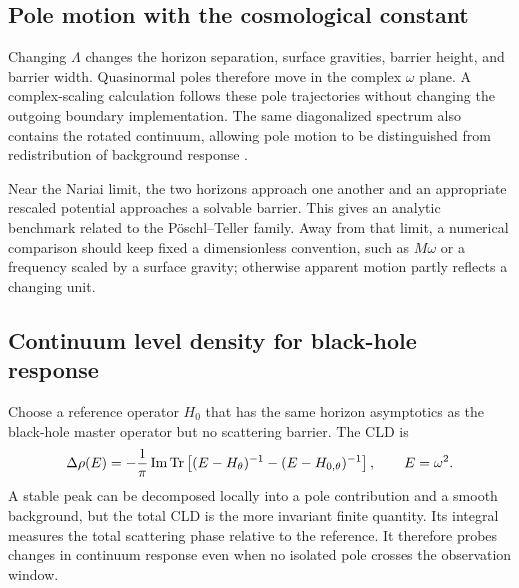\subsection{Pole motion with the cosmological constant}
\label{subsec:sds-pole-motion}

Changing $\Lambda$ changes the horizon separation, surface gravities, barrier
height, and barrier width.  Quasinormal poles therefore move in the complex
$\omega$ plane.  A complex-scaling calculation follows these pole trajectories
without changing the outgoing boundary implementation.  The same diagonalized
spectrum also contains the rotated continuum, allowing pole motion to be
distinguished from redistribution of background response
\cite{Ogawa:2026dSCSM}.

Near the Nariai limit, the two horizons approach one another and an appropriate
rescaled potential approaches a solvable barrier.  This gives an analytic
benchmark related to the P\"oschl--Teller family.  Away from that limit, a
numerical comparison should keep fixed a dimensionless convention, such as
$M\omega$ or a frequency scaled by a surface gravity; otherwise apparent
motion partly reflects a changing unit.

\subsection{Continuum level density for black-hole response}
\label{subsec:bh-cld}

Choose a reference operator $H_0$ that has the same horizon asymptotics as the
black-hole master operator but no scattering barrier.  The CLD is
\begin{equation}
  \Delta\rho(E)
  =-\frac{1}{\pi}\operatorname{Im}\operatorname{Tr}\left[
  (E-H_\theta)^{-1}
  -(E-H_{0,\theta})^{-1}
  \right],
  \qquad E=\omega^2 .
  \label{eq:bh-cld}
\end{equation}
A stable peak can be decomposed locally into a pole contribution and a smooth
background, but the total CLD is the more invariant finite quantity.  Its
integral measures the total scattering phase relative to the reference.  It
therefore probes changes in continuum response even when no isolated pole
crosses the observation window.

